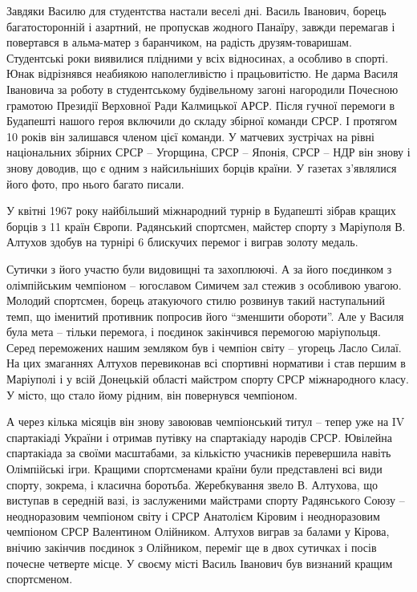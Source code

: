
Завдяки Василю для студентства настали веселі дні. Василь Іванович, борець
багатосторонній і азартний, не пропускав жодного Панаїру, завжди перемагав і
повертався в альма-матер з баранчиком, на радість друзям-товаришам. Студентські
роки виявилися плідними у всіх відносинах, а особливо в спорті. Юнак
відрізнявся неабиякою наполегливістю і працьовитістю. Не дарма Василя Івановича
за роботу в студентському будівельному загоні нагородили Почесною грамотою
Президії Верховної Ради Калмицької АРСР. Після гучної перемоги в Будапешті
нашого героя включили до складу збірної команди СРСР. І протягом 10 років він
залишався членом цієї команди. У матчевих зустрічах на рівні національних
збірних СРСР – Угорщина, СРСР – Японія, СРСР – НДР він знову і знову доводив,
що є одним з найсильніших борців країни. У газетах з'являлися його фото, про
нього багато писали.

У квітні 1967 року найбільший міжнародний турнір в Будапешті зібрав кращих
борців з 11 країн Європи. Радянський спортсмен, майстер спорту з Маріуполя В.
Алтухов здобув на турнірі 6 блискучих перемог і виграв золоту медаль.


Сутички з його участю були видовищні та захоплюючі. А за його поєдинком з
олімпійським чемпіоном – югославом Симичем зал стежив з особливою увагою.
Молодий спортсмен, борець атакуючого стилю розвинув такий наступальний темп, що
іменитий противник попросив його \enquote{зменшити обороти}. Але у Василя була мета –
тільки перемога, і поєдинок закінчився перемогою маріупольця. Серед переможених
нашим земляком був і чемпіон світу – угорець Ласло Силаї. На цих змаганнях
Алтухов перевиконав всі спортивні нормативи і став першим в Маріуполі і у всій
Донецькій області майстром спорту СРСР міжнародного класу. У місто, що стало
йому рідним, він повернувся чемпіоном.

А через кілька місяців він знову завоював чемпіонський титул – тепер уже на IV
спартакіаді України і отримав путівку на спартакіаду народів СРСР. Ювілейна
спартакіада за своїми масштабами, за кількістю учасників перевершила навіть
Олімпійські ігри. Кращими спортсменами країни були представлені всі види
спорту, зокрема, і класична боротьба. Жеребкування звело В. Алтухова, що
виступав в середній вазі, із заслуженими майстрами спорту Радянського Союзу –
неодноразовим чемпіоном світу і СРСР Анатолієм Кіровим і неодноразовим
чемпіоном СРСР Валентином Олійником. Алтухов виграв за балами у Кірова, внічию
закінчив поєдинок з Олійником, переміг ще в двох сутичках і посів почесне
четверте місце. У своєму місті Василь Іванович був визнаний кращим спортсменом.

